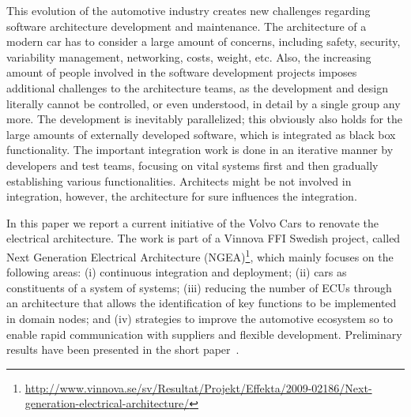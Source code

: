 \documentclass[preprint,12pt,3p]{elsarticle}
\begin{document}
This evolution of the automotive industry %
creates new challenges regarding software
architecture development and maintenance. 
The architecture of a modern car has to consider a large amount of concerns, including safety, security, variability management, networking, costs, weight, etc.
Also, the increasing amount of people
involved in the software development projects imposes additional challenges to the
architecture teams, as the development and design literally cannot be
controlled, or even understood, in detail by a single group any more. The
development is inevitably parallelized; this obviously also holds for the large
amounts of externally developed software, which is integrated as black box
functionality. The important integration work is done in an iterative manner by
developers and test teams, focusing on vital systems first and then gradually
establishing various functionalities. Architects might be not involved in integration, 
however, the architecture for sure influences the integration.

In this paper we report a current initiative of the Volvo Cars to renovate the
electrical architecture. 
The work is part of a Vinnova FFI Swedish project, called Next Generation Electrical Architecture
 (NGEA)\footnote{\small{\url{http://www.vinnova.se/sv/Resultat/Projekt/Effekta/2009-02186/Next-generation-electrical-architecture/}}},
which mainly focuses on the following areas: (i) continuous integration and deployment; (ii)
cars as constituents of a system of systems; (iii) reducing the number of ECUs through an architecture that allows the identification of key functions to be implemented in domain nodes; and (iv) strategies to improve the automotive ecosystem so to enable rapid communication with suppliers and flexible development. Preliminary results have been presented in the short paper~\cite{WasaPaper}.

\end{document}
